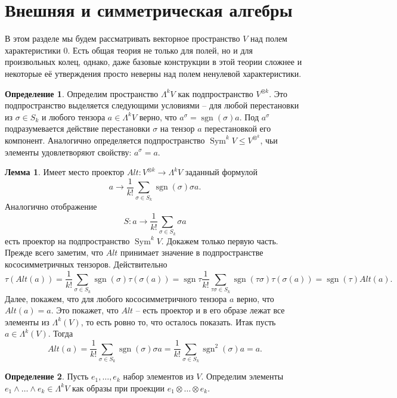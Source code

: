 \documentclass[10pt,a4paper,oneside]{book}
\theoremstyle{definition}
\newtheorem*{defn}{{\color{yellow!30!red} Определение}}
\newtheorem{lem}{{\color{green!50!black} Лемма}}
\newcommand{\Sym}{\operatorname{Sym}}
\newcommand{\sgn}{\operatorname{sgn}}
\def\dfn{\begin{defn}}
\def\edfn{\end{defn}}
\def\lm{\begin{lem}}
\def\elm{\end{lem}}
\begin{document}
\section{Внешняя и симметрическая алгебры}

В этом разделе мы будем рассматривать векторное пространство $V$ над полем характеристики $0$. Есть общая теория не только для полей, но и для произвольных колец, однако, даже базовые конструкции в этой теории сложнее и некоторые её утверждения просто неверны над полем ненулевой характеристики.

\dfn Определим пространство $\Lambda^k V$ как подпространство $V^{\otimes k}$. Это подпространство выделяется следующими условиями -- для любой перестановки из $\sigma \in S_k$ и любого тензора $a\in \Lambda^k V$ верно, что $a^{\sigma}=\sgn(\sigma)a$. Под $a^{\sigma}$ подразумевается действие перестановки $\sigma$ на тензор $a$ перестановкой его компонент. Аналогично определяется подпространство $\Sym^k V \leq V^{\otimes^k}$, чьи элементы удовлетворяют свойству: $a^{\sigma}=a$.
\edfn

\lm Имеет место проектор $Alt \colon V^{\otimes k} \to \Lambda^k V$ заданный формулой 
$$a \to \frac{1}{k!} \sum_{\sigma \in S_k} \sgn (\sigma) \sigma a.$$
Аналогично отображение  
$$S\colon a \to \frac{1}{k!} \sum_{\sigma \in S_k} \sigma a$$
есть проектор на подпространство $\Sym^k V$.
\proof Докажем только первую часть. Прежде всего заметим, что $Alt$ принимает значение в подпространстве кососимметричных тензоров. Действительно 
$$\tau(Alt(a))=\frac{1}{k!}\sum_{\sigma \in S_k}\sgn(\sigma) \tau(\sigma(a))= \sgn{\tau} \frac{1}{k!}\sum_{\tau\sigma \in S_k} \sgn(\tau\sigma) \tau(\sigma(a))=\sgn(\tau) Alt(a).$$
Далее, покажем, что для любого кососимметричного тензора $a$ верно, что $Alt(a)=a$. Это покажет, что $Alt$ -- есть проектор и в его образе лежат все элементы из $\Lambda^k(V)$, то есть ровно то, что осталось показать. Итак пусть $a\in \Lambda^k(V)$. Тогда 
$$Alt(a)=\frac{1}{k!} \sum_{\sigma \in S_k} \sgn (\sigma) \sigma a=\frac{1}{k!} \sum_{\sigma \in S_k} \sgn^2(\sigma) a=a.$$
\endproof
\elm

\dfn Пусть $e_1,\dots, e_k$ набор элементов из $V$. Определим элементы $e_1\wedge \dots \wedge e_k \in \Lambda^k V$ как образы при проекции $e_1\otimes \dots \otimes e_k$.
\edfn
\end{document}
